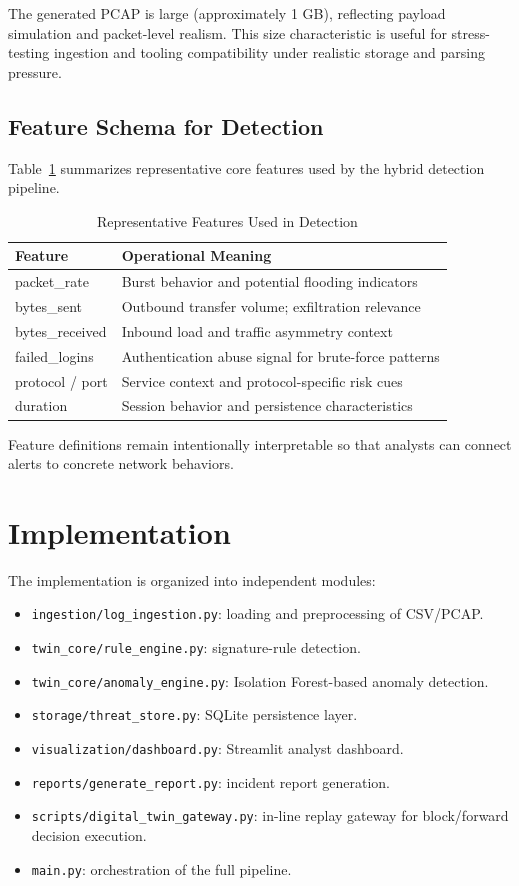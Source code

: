 \documentclass[conference]{IEEEtran}
\begin{document}
The generated PCAP is large (approximately 1 GB), reflecting payload simulation and packet-level realism. This size characteristic is useful for stress-testing ingestion and tooling compatibility under realistic storage and parsing pressure.

\subsection{Feature Schema for Detection}
Table~\ref{tab:features} summarizes representative core features used by the hybrid detection pipeline.

\begin{table}[h]
\centering
\caption{Representative Features Used in Detection}
\label{tab:features}
\begin{tabular}{lp{4.8cm}}
\toprule
Feature & Operational Meaning \\
\midrule
packet\_rate & Burst behavior and potential flooding indicators \\
bytes\_sent & Outbound transfer volume; exfiltration relevance \\
bytes\_received & Inbound load and traffic asymmetry context \\
failed\_logins & Authentication abuse signal for brute-force patterns \\
protocol / port & Service context and protocol-specific risk cues \\
duration & Session behavior and persistence characteristics \\
\bottomrule
\end{tabular}
\end{table}

Feature definitions remain intentionally interpretable so that analysts can connect alerts to concrete network behaviors.

\section{Implementation}
The implementation is organized into independent modules:
\begin{itemize}
    \item \texttt{ingestion/log\_ingestion.py}: loading and preprocessing of CSV/PCAP.
    \item \texttt{twin\_core/rule\_engine.py}: signature-rule detection.
    \item \texttt{twin\_core/anomaly\_engine.py}: Isolation Forest-based anomaly detection.
    \item \texttt{storage/threat\_store.py}: SQLite persistence layer.
    \item \texttt{visualization/dashboard.py}: Streamlit analyst dashboard.
    \item \texttt{reports/generate\_report.py}: incident report generation.
    \item \texttt{scripts/digital\_twin\_gateway.py}: in-line replay gateway for block/forward decision execution.
    \item \texttt{main.py}: orchestration of the full pipeline.
\end{itemize}
\end{document}
